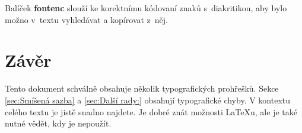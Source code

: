 \documentclass[10pt,a4paper, twocolumn]{article}
\begin{document}
Balíček \textbf{fontenc} slouží ke korektnímu kódovaní znaků s~diakritikou, aby bylo možno v~textu vyhledávat a kopírovat z~něj.

\section{Závěr}\label{sec:Závěr}
Tento dokument schválně obsahuje několik typografických prohřešků.
Sekce \ref{sec:Smíšená sazba} a \ref{sec:Další rady:} obsahují typografické chyby.
V kontextu celého textu je jistě snadno najdete.
Je dobré znát možnosti \LaTeX u, ale je také nutné vědět, kdy je nepoužít.
\end{document}
